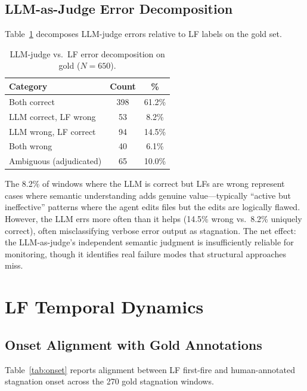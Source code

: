 \documentclass[11pt]{article}
\begin{document}
\subsection{LLM-as-Judge Error Decomposition}

Table~\ref{tab:llm-errors} decomposes LLM-judge errors relative to LF labels on the gold set.

\begin{table}[t]
\centering
\small
\caption{LLM-judge vs.\ LF error decomposition on gold ($N\!=\!650$).}
\label{tab:llm-errors}
\begin{tabular}{lcc}
\toprule
Category & Count & \% \\
\midrule
Both correct & 398 & 61.2\% \\
LLM correct, LF wrong & 53 & 8.2\% \\
LLM wrong, LF correct & 94 & 14.5\% \\
Both wrong & 40 & 6.1\% \\
Ambiguous (adjudicated) & 65 & 10.0\% \\
\bottomrule
\end{tabular}
\end{table}

The 8.2\% of windows where the LLM is correct but LFs are wrong represent cases where semantic understanding adds genuine value---typically ``active but ineffective'' patterns where the agent edits files but the edits are logically flawed. However, the LLM errs more often than it helps (14.5\% wrong vs.\ 8.2\% uniquely correct), often misclassifying verbose error output as stagnation. The net effect: the LLM-as-judge's independent semantic judgment is insufficiently reliable for monitoring, though it identifies real failure modes that structural approaches miss.

\section{LF Temporal Dynamics}
\label{sec:temporal}

\subsection{Onset Alignment with Gold Annotations}

Table~\ref{tab:onset} reports alignment between LF first-fire and human-annotated stagnation onset across the 270 gold stagnation windows.
\end{document}
